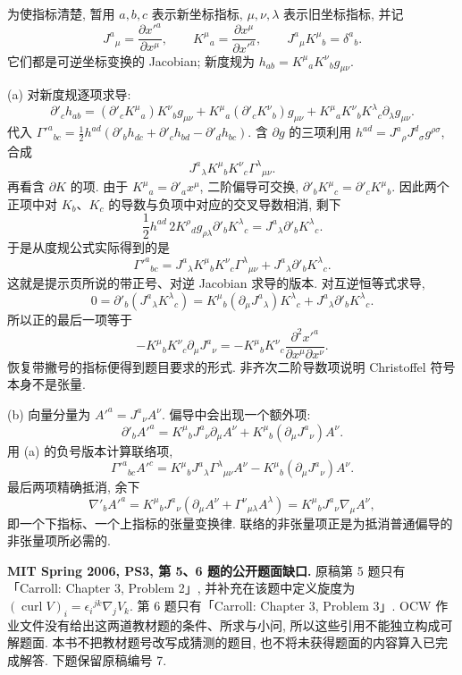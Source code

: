 \begin{solution}
为使指标清楚, 暂用 $a,b,c$ 表示新坐标指标, $\mu,\nu,\lambda$ 表示旧坐标指标, 并记
\[
 J^a{}_{\mu}=\frac{\partial x'^a}{\partial x^\mu},\qquad
 K^\mu{}_{a}=\frac{\partial x^\mu}{\partial x'^a},\qquad
 J^a{}_{\mu}K^\mu{}_{b}=\delta^a{}_b.
\]
它们都是可逆坐标变换的 Jacobian; 新度规为 $h_{ab}=K^\mu{}_aK^\nu{}_b g_{\mu\nu}$.

(a) 对新度规逐项求导:
\[
 \partial'_c h_{ab}=(\partial'_cK^\mu{}_a)K^\nu{}_b g_{\mu\nu}
 +K^\mu{}_a(\partial'_cK^\nu{}_b)g_{\mu\nu}
 +K^\mu{}_aK^\nu{}_bK^\lambda{}_c\partial_\lambda g_{\mu\nu}.
\]
代入 $\Gamma'^a{}_{bc}=\tfrac12h^{ad}(\partial'_bh_{dc}+\partial'_ch_{bd}-\partial'_dh_{bc})$. 含 $\partial g$ 的三项利用 $h^{ad}=J^a{}_{\rho}J^d{}_{\sigma}g^{\rho\sigma}$, 合成
\[
 J^a{}_{\lambda}K^\mu{}_bK^\nu{}_c\Gamma^\lambda{}_{\mu\nu}.
\]
再看含 $\partial K$ 的项. 由于 $K^\mu{}_a=\partial'_a x^\mu$, 二阶偏导可交换, $\partial'_bK^\mu{}_c=\partial'_cK^\mu{}_b$. 因此两个正项中对 $K_b$、$K_c$ 的导数与负项中对应的交叉导数相消, 剩下
\[
 \frac12h^{ad}\,2K^\rho{}_d g_{\rho\lambda}\partial'_bK^\lambda{}_c
 =J^a{}_{\lambda}\partial'_bK^\lambda{}_c.
\]
于是从度规公式实际得到的是
\[
 \Gamma'^a{}_{bc}=J^a{}_{\lambda}K^\mu{}_bK^\nu{}_c\Gamma^\lambda{}_{\mu\nu}
 +J^a{}_{\lambda}\partial'_bK^\lambda{}_c.
\]
这就是提示页所说的带正号、对逆 Jacobian 求导的版本. 对互逆恒等式求导,
\[
 0=\partial'_b(J^a{}_{\lambda}K^\lambda{}_c)
 =K^\mu{}_b(\partial_\mu J^a{}_{\lambda})K^\lambda{}_c
 +J^a{}_{\lambda}\partial'_bK^\lambda{}_c.
\]
所以正的最后一项等于
\[
 -K^\mu{}_bK^\nu{}_c\partial_\mu J^a{}_{\nu}
 =-K^\mu{}_bK^\nu{}_c\frac{\partial^2x'^a}{\partial x^\mu\partial x^\nu}.
\]
恢复带撇号的指标便得到题目要求的形式. 非齐次二阶导数项说明 Christoffel 符号本身不是张量.

(b) 向量分量为 $A'^a=J^a{}_{\nu}A^\nu$. 偏导中会出现一个额外项:
\[
 \partial'_bA'^a=K^\mu{}_bJ^a{}_{\nu}\partial_\mu A^\nu
 +K^\mu{}_b(\partial_\mu J^a{}_{\nu})A^\nu.
\]
用 (a) 的负号版本计算联络项,
\[
 \Gamma'^a{}_{bc}A'^c
 =K^\mu{}_bJ^a{}_{\lambda}\Gamma^\lambda{}_{\mu\nu}A^\nu
 -K^\mu{}_b(\partial_\mu J^a{}_{\nu})A^\nu.
\]
最后两项精确抵消, 余下
\[
 \nabla'_b A'^a=K^\mu{}_bJ^a{}_{\nu}
 (\partial_\mu A^\nu+\Gamma^\nu{}_{\mu\lambda}A^\lambda)
 =K^\mu{}_bJ^a{}_{\nu}\nabla_\mu A^\nu,
\]
即一个下指标、一个上指标的张量变换律. 联络的非张量项正是为抵消普通偏导的非张量项所必需的.
\end{solution}

\begin{remark}
\textbf{MIT Spring 2006, PS3, 第 5、6 题的公开题面缺口.}
原稿第 5 题只有「Carroll: Chapter 3, Problem 2」, 并补充在该题中定义旋度为 $(\operatorname{curl}V)_i=\epsilon_i{}^{jk}\nabla_jV_k$. 第 6 题只有「Carroll: Chapter 3, Problem 3」. OCW 作业文件没有给出这两道教材题的条件、所求与小问, 所以这些引用不能独立构成可解题面. 本书不把教材题号改写成猜测的题目, 也不将未获得题面的内容算入已完成解答. 下题保留原稿编号 7.
\end{remark}

